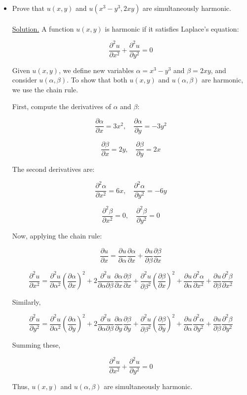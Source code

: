 \documentclass{article}
\begin{document}
\begin{itemize}
    \item Prove that $u(x,y)$ and $u(x^3-y^3, 2xy)$ are simultaneously harmonic.
    \\
    \\
    \underline{Solution.} 
    A function \( u(x,y) \) is harmonic if it satisfies Laplace’s equation:  

\[
\frac{\partial^2 u}{\partial x^2} + \frac{\partial^2 u}{\partial y^2} = 0
\]

Given \( u(x, y) \), we define new variables \( \alpha = x^3 - y^3 \) and \( \beta = 2xy \), and consider \( u(\alpha, \beta) \). To show that both \( u(x, y) \) and \( u(\alpha, \beta) \) are harmonic, we use the chain rule.

First, compute the derivatives of \( \alpha \) and \( \beta \):

\[
\frac{\partial \alpha}{\partial x} = 3x^2, \quad \frac{\partial \alpha}{\partial y} = -3y^2
\]

\[
\frac{\partial \beta}{\partial x} = 2y, \quad \frac{\partial \beta}{\partial y} = 2x
\]

The second derivatives are:

\[
\frac{\partial^2 \alpha}{\partial x^2} = 6x, \quad \frac{\partial^2 \alpha}{\partial y^2} = -6y
\]

\[
\frac{\partial^2 \beta}{\partial x^2} = 0, \quad \frac{\partial^2 \beta}{\partial y^2} = 0
\]

Now, applying the chain rule:

\[
\frac{\partial u}{\partial x} = \frac{\partial u}{\partial \alpha} \frac{\partial \alpha}{\partial x} + \frac{\partial u}{\partial \beta} \frac{\partial \beta}{\partial x}
\]

\[
\frac{\partial^2 u}{\partial x^2} = \frac{\partial^2 u}{\partial \alpha^2} \left(\frac{\partial \alpha}{\partial x}\right)^2 + 2 \frac{\partial^2 u}{\partial \alpha \partial \beta} \frac{\partial \alpha}{\partial x} \frac{\partial \beta}{\partial x} + \frac{\partial^2 u}{\partial \beta^2} \left(\frac{\partial \beta}{\partial x}\right)^2 + \frac{\partial u}{\partial \alpha} \frac{\partial^2 \alpha}{\partial x^2} + \frac{\partial u}{\partial \beta} \frac{\partial^2 \beta}{\partial x^2}
\]

Similarly,

\[
\frac{\partial^2 u}{\partial y^2} = \frac{\partial^2 u}{\partial \alpha^2} \left(\frac{\partial \alpha}{\partial y}\right)^2 + 2 \frac{\partial^2 u}{\partial \alpha \partial \beta} \frac{\partial \alpha}{\partial y} \frac{\partial \beta}{\partial y} + \frac{\partial^2 u}{\partial \beta^2} \left(\frac{\partial \beta}{\partial y}\right)^2 + \frac{\partial u}{\partial \alpha} \frac{\partial^2 \alpha}{\partial y^2} + \frac{\partial u}{\partial \beta} \frac{\partial^2 \beta}{\partial y^2}
\]

Summing these,

\[
\frac{\partial^2 u}{\partial x^2} + \frac{\partial^2 u}{\partial y^2} = 0
\]

Thus, \( u(x, y) \) and \( u(\alpha, \beta) \) are simultaneously harmonic.
\end{itemize}
\end{document}
